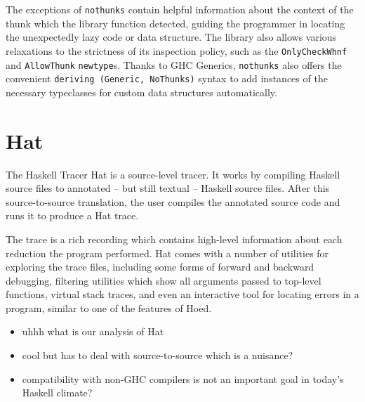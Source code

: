 \documentclass[thesis=B,english]{FITthesis}[2019/12/23]
\begin{document}
The exceptions of \texttt{nothunks} contain helpful information about the
context of the thunk which the library function detected, guiding the
programmer in locating the unexpectedly lazy code or data structure. The
library also allows various relaxations to the strictness of its inspection
policy, such as the \texttt{OnlyCheckWhnf} and \texttt{AllowThunk}
\texttt{newtype}s. Thanks to GHC Generics, %
\texttt{nothunks} also offers the convenient \texttt{deriving (Generic,
NoThunks)} syntax to add instances of the necessary typeclasses for custom data
structures automatically.


\section{Hat}
The Haskell Tracer Hat\cite{proj-hat} is a source-level tracer. It works by
compiling Haskell source files to annotated -- but still textual -- Haskell
source files. After this source-to-source translation, the user compiles the
annotated source code and runs it to produce a Hat trace.

The trace is a rich recording which contains high-level information about each
reduction the program performed. Hat comes with a number of utilities for
exploring the trace files, including some forms of forward and backward
debugging, filtering utilities which show all arguments passed to top-level
functions, virtual stack traces, and even an interactive tool for locating
errors in a program, similar to one of the features of Hoed.

\begin{itemize}
	\item uhhh what is our analysis of Hat
	\item cool but has to deal with source-to-source which is a nuisance?
	\item compatibility with non-GHC compilers is not an important goal in
		today's Haskell climate?
\end{itemize}

\end{document}
